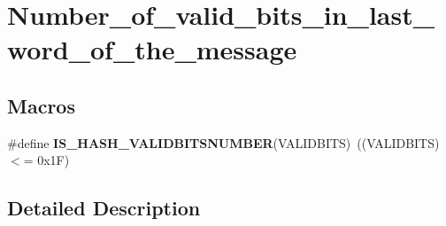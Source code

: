 \hypertarget{group___number__of__valid__bits__in__last__word__of__the__message}{}\section{Number\+\_\+of\+\_\+valid\+\_\+bits\+\_\+in\+\_\+last\+\_\+word\+\_\+of\+\_\+the\+\_\+message}
\label{group___number__of__valid__bits__in__last__word__of__the__message}
\subsection*{Macros}
\begin{DoxyCompactItemize}
\item 
\hypertarget{group___number__of__valid__bits__in__last__word__of__the__message_gafd2b91c276bd9174867b2b33b4a08c8c}{}\#define {\bfseries I\+S\+\_\+\+H\+A\+S\+H\+\_\+\+V\+A\+L\+I\+D\+B\+I\+T\+S\+N\+U\+M\+B\+E\+R}(V\+A\+L\+I\+D\+B\+I\+T\+S)~((V\+A\+L\+I\+D\+B\+I\+T\+S) $<$= 0x1\+F)\label{group___number__of__valid__bits__in__last__word__of__the__message_gafd2b91c276bd9174867b2b33b4a08c8c}

\end{DoxyCompactItemize}


\subsection{Detailed Description}

